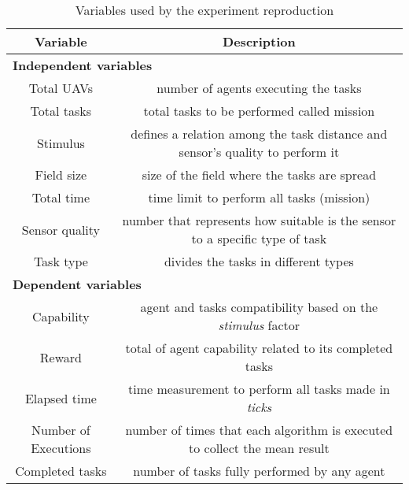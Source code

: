 \begin{table}%
	\small
	\fontsize{6}{6}\selectfont
	\centering
	\caption{Variables used by the experiment reproduction}
	\label{table:variables}
	
	\begin{tabular}{cc}
	\hline
		Variable
		& Description\\ [1ex]
	\hline	
	\multicolumn{2}{l}{\textbf{Independent variables}} \\
	\hline
	Total UAVs           & number of agents executing the tasks \\[1ex]
	Total tasks          & total tasks to be performed called mission \\[1ex]
	Stimulus                 & defines a relation among the task distance and sensor's quality to perform it  \\[1ex]
	Field size               & size of the field where the tasks are spread \\[1ex]
	Total time               & time limit to perform all tasks (mission)\\[1ex]
	Sensor quality           & number that represents how suitable is the sensor to a specific type of task\\[1ex]
	Task type                & divides the tasks in different types\\[1ex]
	\multicolumn{2}{l}{\textbf{Dependent variables}} \\
	\hline
	Capability               & agent and tasks compatibility based on the \textit{stimulus} factor \\[1ex]
	Reward                   & total of agent capability related to its completed tasks \\[1ex]
	Elapsed time             & time measurement to perform all tasks made in \textit{ticks}\\[1ex]
	Number of Executions     & number of times that each algorithm is executed to collect the mean result\\[1ex]
	Completed tasks          & number of tasks fully performed by any agent\\[1ex]
	\hline
	\end{tabular}
\end{table} 

